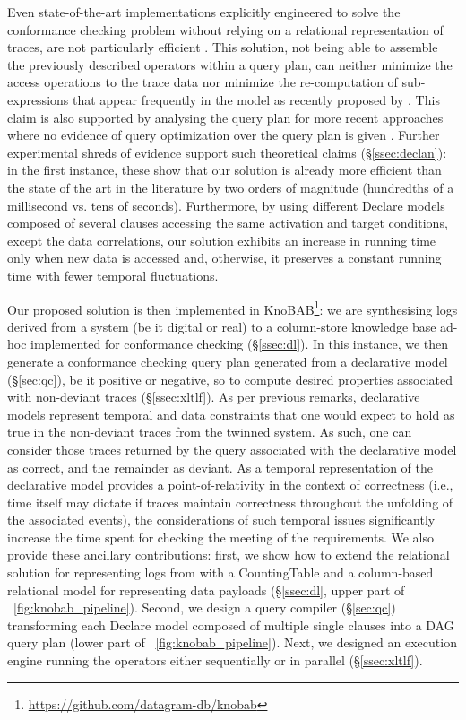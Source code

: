 Even state-of-the-art implementations explicitly engineered to solve the conformance checking problem without relying on a 
relational representation of traces, are not particularly efficient \cite{BurattinMS16}. This solution, not being able to assemble the previously described \LTLf operators within a query plan, can neither minimize the access operations to the trace data nor  minimize the re-computation of sub-expressions that appear frequently in the model as recently proposed by \cite{BellatrecheKB21}. This claim is also supported by analysing the query plan for more recent approaches where no evidence of query optimization over the query plan is given \cite{Polyvyanyy2022,MurillasRA22}. Further experimental shreds of evidence support such theoretical claims (\S\ref{ssec:declan}): in the first instance, these show that our solution is already more efficient than the state of the art in the literature by two orders of magnitude (hundredths of a millisecond vs. tens of seconds). Furthermore, by using different Declare models composed of several clauses accessing the same activation and target conditions, except the data correlations, our solution exhibits an increase in running time only when new data is accessed and, otherwise, it preserves a constant running time with fewer temporal fluctuations.

Our proposed solution is then implemented in KnoBAB\footnote{\url{https://github.com/datagram-db/knobab}}: we are synthesising logs derived from a system (be it digital or real) to a column-store knowledge base ad-hoc implemented for conformance checking (\S\ref{ssec:dl}). In this instance, we then generate a conformance checking query plan generated from a declarative model (\S\ref{sec:qc}), be it positive or negative, so to compute desired properties associated with non-deviant traces (\S\ref{ssec:xltlf}). As per previous remarks, declarative models represent temporal and data constraints that one would expect to hold as true in the non-deviant traces from the twinned system. As such, one can consider those traces returned by the query associated with the declarative model as correct, and the remainder as deviant. As a temporal representation of the declarative model provides a point-of-relativity in the context of correctness (i.e., time itself may dictate if traces maintain correctness throughout the unfolding of the associated events), the considerations of such temporal issues significantly increase the time spent for checking the meeting of the requirements.   We also provide these ancillary contributions: first, we show how to extend the relational solution for representing logs from \cite{Schonig15,SchonigRCJM16} with a \textsf{CountingTable} and a column-based relational model for representing data payloads (\S\ref{ssec:dl}, upper part of \figurename~\ref{fig:knobab_pipeline}). Second, we design a query compiler (\S\ref{sec:qc}) transforming each Declare model composed of multiple single clauses into a DAG query plan (lower part of \figurename~\ref{fig:knobab_pipeline}). Next, we designed an execution engine running the \xLTLf operators either sequentially or in parallel (\S\ref{ssec:xltlf}).
